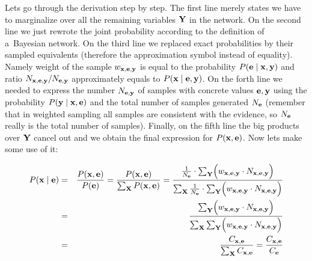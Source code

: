 \documentclass[english,cover]{fitthesis} %
\newcommand{\vars}[1]{{\bold{#1}}}         %
\begin{document}
Lets go through the derivation step by step. The first line merely states we have to marginalize over all the remaining variables $\vars{Y}$ in the network.
On the second line we just rewrote the joint probability according to the definition of a~Bayesian network.
On the third line we replaced exact probabilities by their sampled equivalents (therefore the approximation symbol instead of equality). Namely weight of the sample $w_{\vars{x},\vars{e},\vars{y}}$ is equal to the probability $P(\vars{e} \mid \vars{x},\vars{y})$ and ratio $N_{\vars{x},\vars{e},\vars{y}} / N_{\vars{e},\vars{y}}$ approximately equals to $P(\vars{x} \mid \vars{e},\vars{y})$.
On the forth line we needed to express the number $N_{\vars{e},\vars{y}}$ of samples with concrete values $\vars{e},\vars{y}$ using the probability $P(\vars{y} \mid \vars{x},\vars{e})$ and the total number of samples generated $N_\vars{e}$ (remember that in weighted sampling all samples are consistent with the evidence, so $N_\vars{e}$ really is the total number of samples).
Finally, on the fifth line the big products over $\vars{Y}$ cancel out and we obtain the final expression for $P(\vars{x},\vars{e})$.
Now lets make some use of it:

\begin{eqnarray*}
    P(\vars{x} \mid \vars{e})
    & = &
      \frac
        {P(\vars{x},\vars{e})}
        {P(\vars{e})} = \frac{P(\vars{x},\vars{e})}{\sum_\vars{X} P(\vars{x},\vars{e})}
    = \frac
        {\frac{1}{N_\vars{e}} \cdot \sum_\vars{Y} \Bigl( w_{\vars{x},\vars{e},\vars{y}} \cdot N_{\vars{x},\vars{e},\vars{y}}\Bigr)}
        {\sum_\vars{X} \frac{1}{N_\vars{e}} \cdot \sum_\vars{Y} \Bigl( w_{\vars{x},\vars{e},\vars{y}} \cdot N_{\vars{x},\vars{e},\vars{y}}\Bigr)} \\
    & = &
      \frac
        {\sum_\vars{Y} \Bigl( w_{\vars{x},\vars{e},\vars{y}} \cdot N_{\vars{x},\vars{e},\vars{y}}\Bigr)}
        {\sum_\vars{X} \sum_\vars{Y} \Bigl( w_{\vars{x},\vars{e},\vars{y}} \cdot N_{\vars{x},\vars{e},\vars{y}}\Bigr)} \\
    & = & \frac{C_{\vars{x},\vars{e}}}{\sum_\vars{X} C_{\vars{x},\vars{e}}}
      = \frac{C_{\vars{x},\vars{e}}}{C_{\vars{e}}}
\end{eqnarray*}
\end{document}
